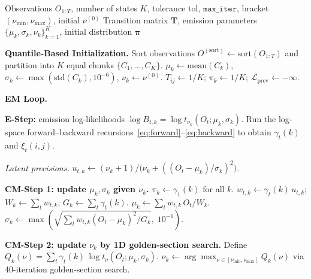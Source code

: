 \begin{algorithm}[tp]
\caption{ECM algorithm for continuous Student-t HMM (CHMM-t) parameter estimation}
\label{alg:ecm_student_t}
\small
\begin{algorithmic}[1]
\REQUIRE Observations $O_{1:T}$, number of states $K$, tolerance $\text{tol}$, $\texttt{max\_iter}$, bracket $(\nu_{\min}, \nu_{\max})$, initial $\nu^{(0)}$
\ENSURE Transition matrix $\mathbf{T}$, emission parameters $\{\mu_k, \sigma_k, \nu_k\}_{k=1}^K$, initial distribution $\boldsymbol{\pi}$

\STATE \textbf{Quantile-Based Initialization.}
\STATE Sort observations $O^{(\text{sort})} \leftarrow \text{sort}(O_{1:T})$ and partition into $K$ equal chunks $\{C_1, \ldots, C_K\}$.
    \STATE $\mu_k \leftarrow \text{mean}(C_k)$, \quad $\sigma_k \leftarrow \max(\text{std}(C_k), 10^{-6})$, \quad $\nu_k \leftarrow \nu^{(0)}$.
\ENDFOR
\STATE $T_{ij} \leftarrow 1/K$; \quad $\pi_k \leftarrow 1/K$; \quad $\mathcal{L}_{\text{prev}} \leftarrow -\infty$.

\STATE \textbf{EM Loop.}

    \STATE \textbf{E-Step:} emission log-likelihoods $\log B_{t,k} = \log t_{\nu_k}(O_t; \mu_k, \sigma_k)$.
    \STATE Run the log-space forward--backward recursions~\eqref{eq:forward}--\eqref{eq:backward} to obtain $\gamma_t(k)$ and $\xi_t(i,j)$.

    \STATE \textit{Latent precisions.}
        \STATE $u_{t,k} \leftarrow (\nu_k + 1) / \big(\nu_k + ((O_t - \mu_k)/\sigma_k)^2\big)$.
    \ENDFOR

    \STATE \textbf{CM-Step 1: update $\mu_k, \sigma_k$ given $\nu_k$.}
    \STATE $\pi_k \leftarrow \gamma_1(k)$ for all $k$.
        \STATE $w_{t,k} \leftarrow \gamma_t(k)\, u_{t,k}$; \quad $W_k \leftarrow \sum_t w_{t,k}$; \quad $G_k \leftarrow \sum_t \gamma_t(k)$.
        \STATE $\mu_k \leftarrow \sum_t w_{t,k}\, O_t / W_k$.
        \STATE $\sigma_k \leftarrow \max\!\left(\sqrt{\sum_t w_{t,k} (O_t - \mu_k)^2 / G_k},\; 10^{-6}\right)$.
    \ENDFOR

    \STATE \textbf{CM-Step 2: update $\nu_k$ by 1D golden-section search.}
        \STATE Define $Q_k(\nu) = \sum_t \gamma_t(k)\, \log t_\nu(O_t; \mu_k, \sigma_k)$.
        \STATE $\nu_k \leftarrow \arg\max_{\nu \in [\nu_{\min}, \nu_{\max}]} Q_k(\nu)$ via 40-iteration golden-section search.
    \ENDFOR


\end{algorithmic}
\end{algorithm}
